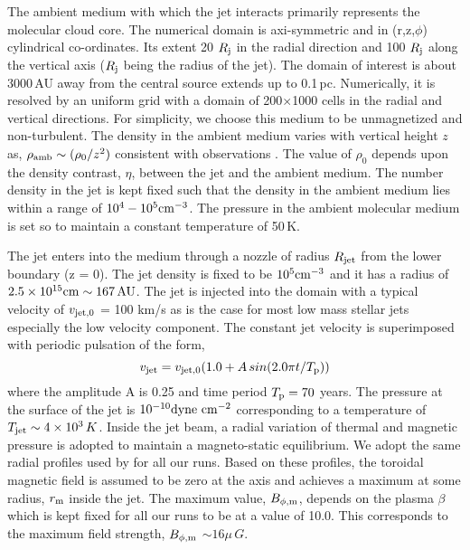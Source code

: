 \documentclass[useAMS,usenatbib,letters]{mn2e}
\begin{document}
The ambient medium with which the jet interacts primarily
represents the molecular cloud core. The numerical domain is axi-symmetric
and in (r,z,$\phi$) cylindrical co-ordinates. Its extent 20 $R_{\rm j}$ in the radial
direction and 100
$R_{\rm j}$ along the vertical axis ($R_{\rm j}$ being the radius of
the jet). The domain of interest is about 3000\,AU away from the
central source extends up to 0.1\,pc. Numerically, it is resolved by an uniform grid with a domain of 200$\times$1000 cells in the radial and vertical directions. For simplicity, we choose this medium
to be unmagnetized and non-turbulent. The density in the ambient
medium varies with vertical height $z$ as, $\rho_{\rm amb}\sim (\rho_0/z^{2})$
consistent with observations \citep{Caselli:2011p13935}. The value of
$\rho_0$ depends upon the density contrast, $\eta$, between the jet and
the ambient medium. The number density in the jet is kept fixed such
that the density in the ambient medium lies within a range of $10^{4}-10^{5}
\rm cm^{-3}$. The pressure in the ambient molecular medium is
set so to maintain a constant temperature of 50\,K. 
%

The jet enters into the medium through a nozzle of radius $R_{\rm jet}$
from the lower boundary (z = 0). The jet density is fixed to
be $10^{5} \rm cm^{-3}$ and it has a radius of $2.5\times10^{15} \rm cm \sim
167\,AU$. The jet is injected into the domain with a typical 
velocity of $v_{\rm jet,0}$ = 100 km/s as is the case for most low mass stellar jets
especially the low velocity component. The constant jet velocity is
superimposed with periodic pulsation of the form,
\begin{equation}
v_{\rm jet} = v_{\rm jet,0}(1.0 + A\,sin(2.0\pi t/T_{\rm p}))
\end{equation}
where the amplitude A is 0.25 and time period $T_{\rm p} = 70$
years. The pressure at the surface of the jet is $10^{-10} \rm
dyne\,\,cm^{-2}$ corresponding to a temperature of $T_{\rm jet} \sim
4\times10^{3}\,K$. Inside the jet beam, a radial variation of thermal
and magnetic pressure is adopted to maintain a magneto-static
equilibrium. We adopt the
same radial profiles used by \cite{Stone:2000p2650} for all our runs. 
Based on these profiles, the toroidal magnetic field is assumed to be
zero at the axis and achieves a maximum at some radius, $r_{\rm m}$
inside the jet. The maximum value, $B_{\phi,\rm m}$, depends on the
plasma $\beta$ which is kept fixed for all our runs to be at a value
of 10.0. This corresponds to the maximum field strength, $B_{\phi,\rm m}$ $\sim
16\mu\,G$. 
\end{document}
